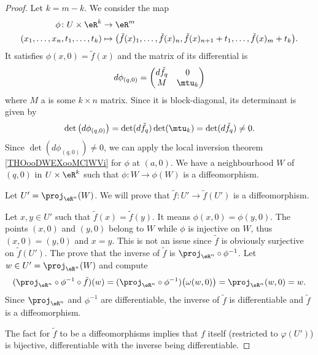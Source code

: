 \begin{proof}
	Let \( k=m-k\). We consider the map
	\begin{equation}
		\begin{aligned}
			\phi\colon U\times \eR^k          & \to \eR^m                                                                                                \\
			(x_1,\ldots, x_n,t_1,\ldots, t_k) & \mapsto \big( \tilde f(x)_1,\ldots, \tilde f(x)_n,\tilde f(x)_{n+1}+t_1,\ldots, \tilde f(x)_m+t_k \big).
		\end{aligned}
	\end{equation}
	It satisfies \( \phi(x,0)=\tilde f(x)\) and the matrix of its differential is
	\begin{equation}
		d\phi_{(q,0)}=\begin{pmatrix}
			d\tilde f_q & 0      \\
			M           & \mtu_k
		\end{pmatrix}
	\end{equation}
	where \( M\) a is some \( k\times n\) matrix. Since it is block-diagonal, its determinant is given by
	\begin{equation}
		\det\big( d\phi_{(q,0)} \big)=\det(d\tilde f_q)\det(\mtu_k)=\det(d\tilde f_q)\neq 0.
	\end{equation}
	Since \( \det(d\phi_{(q,0)})\neq 0\), we can apply the local inversion theorem \ref{THOooDWEXooMClWVi} for \( \phi\) at \( (a,0)\). We have a neighbourhood \( W\) of \( (q,0)\) in \( U\times \eR^k\) such that \( \phi\colon W\to \phi(W)\) is a diffeomorphism.

	Let \( U'=\proj_{\eR^n}(W)\). We will prove that \( \tilde f\colon U'\to \tilde f(U')\) is a diffeomorphism.
	\begin{subproof}
		\spitem[Injective]
		Let \( x,y\in U'\) such that \( \tilde f(x)=\tilde f(y)\). It means \( \phi(x,0)=\phi(y,0)\). The points \( (x,0)\) and \( (y,0)\) belong to \( W\) while \( \phi\) is injective on \( W\), thus \( (x,0)=(y,0)\) and \( x=y\).
		\spitem[Surjective]
		This is not an issue since \( \tilde f\) is obviously surjective on \( \tilde f(U')\).
		The prove that the inverse of \( \tilde f\) is \( \proj_{\eR^n}\circ \phi^{-1}\). Let \( w\in U'=\proj_{\eR^n}(W)\) and compute
		\begin{equation}
			(\proj_{\eR^n}\circ \phi^{-1}\circ\tilde f)(w)=(\proj_{\eR^n}\circ\phi^{-1})\big( \omega(w,0) \big)=\proj_{\eR^n}(w,0)=w.
		\end{equation}
		\spitem[Diffeomorphism]
		Since \( \proj_{\eR^n}\) and \( \phi^{-1}\) are differentiable, the inverse of \( \tilde f\) is differentiable and \( \tilde f\) is a diffeomorphism.
	\end{subproof}
	The fact for \( \tilde f\) to be a diffeomorphisms implies that \( f\) itself (restricted to \( \varphi(U')\)) is bijective, differentiable with the inverse being differentiable.
\end{proof}


